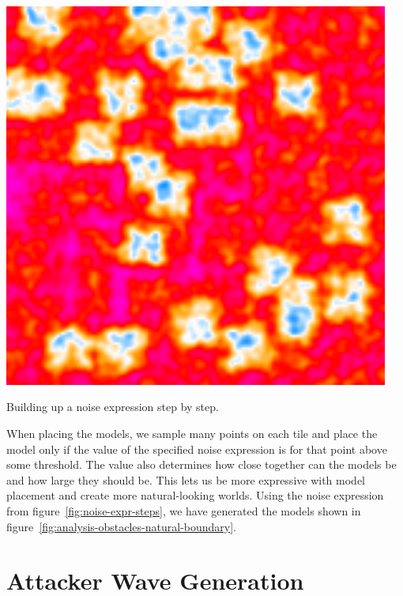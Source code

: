 \begin{center}
\begin{minipage}{.31\textwidth}
        \small{}
    \end{minipage}%
    \begin{minipage}{.31\textwidth}
        \centering
        \includegraphics[width=0.95\textwidth]{img/noise expr step3.png}
        \small{}
    \end{minipage}
    \caption{Building up a noise expression step by step.}
    \label{fig:noise-expr-steps}
\end{center}

When placing the models, we sample many points on each tile and place the model only if the value of the specified noise expression is for that point above some threshold.
The value also determines how close together can the models be and how large they should be.
This lets us be more expressive with model placement and create more natural-looking worlds.
Using the noise expression from figure~\ref{fig:noise-expr-steps}, we have generated the models shown in figure~\ref{fig:analysis-obstacles-natural-boundary}.

\section{Attacker Wave Generation}\label{sec:analysis-waves}

